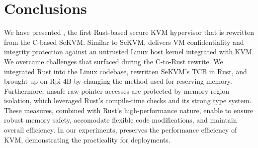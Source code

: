 
\chapter{Conclusions}
\label{sec:conclusions}

We have presented \rustsec{}, the first Rust-based secure KVM hypervisor that
is rewritten from the C-based SeKVM.
Similar to SeKVM, \rustsec{} delivers VM confidentiality and integrity
protection against an untrusted Linux host kernel integrated with KVM.
We overcame challenges that surfaced during the C-to-Rust rewrite. We
integrated Rust into the Linux codebase, rewritten SeKVM's TCB in Rust, and
brought up \rustsec{} on Rpi-4B by changing the method used for reserving
memory.
Furthermore, unsafe raw pointer accesses are protected by memory region
isolation, which leveraged Rust's compile-time checks and its strong type
system.
These measures, combined with Rust's high-performance nature, enable \rustsec{}
to ensure robust memory safety, accomodate flexible code modifications, and
maintain overall efficiency.
In our experiments, \rustsec{} preserves the performance efficiency of KVM,
demonstrating the practicality for deployments.

